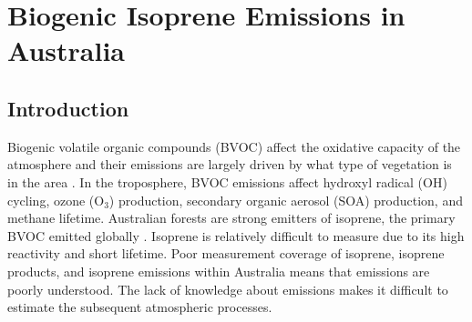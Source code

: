 
%
%



\chapter{Biogenic Isoprene Emissions in Australia} %
\label{BioIsop}
  
\section{Introduction}  
\label{BioIsop:intro}  
  
  
  
  Biogenic volatile organic compounds (BVOC) affect the oxidative capacity of the atmosphere and their emissions are largely driven by what type of vegetation is in the area \parencite{Kefauver2014}.
  In the troposphere, BVOC emissions affect hydroxyl radical (OH) cycling, ozone (O$_3$) production, secondary organic aerosol (SOA) production, and methane lifetime.
  Australian forests are strong emitters of isoprene, the primary BVOC emitted globally \parencite{Guenther2006,Messina2016}. %
  Isoprene is relatively difficult to measure due to its high reactivity and short lifetime.
  Poor measurement coverage of isoprene, isoprene products, and isoprene emissions within Australia means that emissions are poorly understood.
  The lack of knowledge about emissions makes it difficult to estimate the subsequent atmospheric processes. 
  
